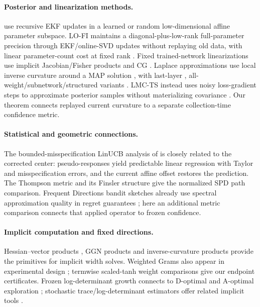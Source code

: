 \paragraph{Posterior and linearization methods.}
\citet{duranmartin2022efficient} use recursive EKF updates in a learned or random
low-dimensional affine parameter subspace. LO-FI maintains a
 diagonal-plus-low-rank full-parameter precision through EKF/online-SVD updates
without replaying old data, with linear parameter-count cost at fixed rank
\citep{chang2023lowrank}. Fixed trained-network linearizations use implicit
Jacobian/Fisher products and CG \citep{maddox2021fast}. Laplace approximations
use local inverse curvature around a MAP solution \citep{mackay1992practical},
with last-layer \citep{kristiadi2020being}, all-weight/subnetwork/structured
variants \citep{daxberger2021laplace,ritter2018scalable,martens2015optimizing}.
LMC-TS instead uses noisy loss-gradient steps to approximate posterior samples
without materializing covariance \citep{xu2022langevin}. Our theorem connects
replayed current curvature to a separate collection-time confidence metric.

\paragraph{Statistical and geometric connections.}
The bounded-misspecification LinUCB analysis of
\citet[Appendix~E]{lattimore2020learning} is closely related to the corrected
center: pseudo-responses yield predictable linear regression with Taylor and
misspecification errors, and the current affine offset restores the prediction.
The Thompson metric \citep{thompson1963certain} and its Finsler structure
\citep{nussbaum1994finsler} give the normalized SPD path comparison.
Frequent Directions bandit sketches already use spectral approximation quality
in regret guarantees \citep{kuzborskij2019efficient}; here an additional metric
comparison connects that applied operator to frozen confidence.

\paragraph{Implicit computation and fixed directions.}
Hessian--vector products \citep{pearlmutter1994fast}, GGN products
\citep{schraudolph2002fast} and inverse-curvature products
\citep{koh2017understanding} provide the primitives for implicit width solves.
Weighted Grams also appear in experimental design
\citep{lattimore2020learning}; termwise scaled-tanh weight comparisons give our
endpoint certificates. Frozen log-determinant growth connects to D-optimal and
A-optimal exploration \citep{valko2013finite}; stochastic trace/log-determinant
estimators offer related implicit tools \citep{ubaru2017fast}.
